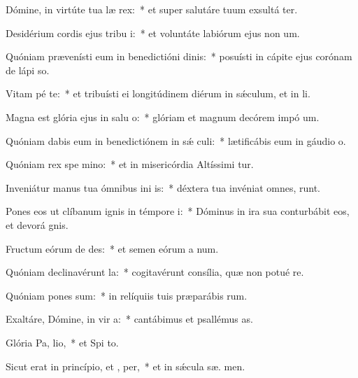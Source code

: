 \item Dómine, in virtúte tua læ rex:~* et super salutáre tuum exsultá ter.
\item Desidérium cordis ejus tribu i:~* et voluntáte labiórum ejus non  um.
\item Quóniam prævenísti eum in benedictióni dinis:~* posuísti in cápite ejus corónam de lápi so.
\item Vitam pé  te:~* et tribuísti ei longitúdinem diérum in sǽculum, et in  li.
\item Magna est glória ejus in salu o:~* glóriam et magnum decórem impó  um.
\item Quóniam dabis eum in benedictiónem in sǽ culi:~* lætificábis eum in gáudio   o.
\item Quóniam rex spe  mino:~* et in misericórdia Altíssimi  tur.
\item Inveniátur manus tua ómnibus ini is:~* déxtera tua invéniat omnes,   runt.
\item Pones eos ut clíbanum ignis in témpore  i:~* Dóminus in ira sua conturbábit eos, et devorá  gnis.
\item Fructum eórum de  des:~* et semen eórum a  num.
\item Quóniam declinavérunt   la:~* cogitavérunt consília, quæ non potué re.
\item Quóniam pones  sum:~* in relíquiis tuis præparábis  rum.
\item Exaltáre, Dómine, in vir a:~* cantábimus et psallémus  as.
\item Glória Pa,  lio,~* et Spi to.
\item Sicut erat in princípio, et ,  per,~* et in sǽcula sæ. men.
